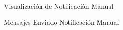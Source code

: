 \begin{figure}[htbp!]
	\centering
	\caption{Visualización de Notificación Manual}
	\label{fig:ManVisualiza}
\end{figure}

\begin{figure}[htbp!]
	\centering
	\caption{Mensajes Enviado Notificación Manual}
	\label{fig:ManMSN}
\end{figure}



 